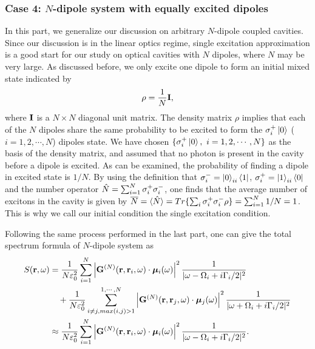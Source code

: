 \subsubsection{Case 4: $N$-dipole system with equally excited dipoles}\label{section:initialcondition}
In this part, we generalize our discussion on arbitrary $N$-dipole coupled cavities. Since our discussion is in the linear optics regime, single excitation approximation is a good start for our study on optical cavities with $N$ dipoles, where $N$ may be very large. As discussed before, we only excite one dipole to form an initial mixed state indicated by
\begin{equation}
\rho=\frac{1}{N}\mathbf{I},
\end{equation}
where $\mathbf{I}$ is a $N\times N$ diagonal unit matrix. The density matrix $\rho$ implies that each of the $N$ dipoles share the same probability to be excited to form the $\sigma^{+}_i\mathinner{|{0}\rangle}$ ($i=1,2,\cdots,N$) dipoles state. We have chosen $\lbrace \sigma^{+}_i\mathinner{|{0}\rangle},\, \,i=1,2,\cdots,N \rbrace$ as the basis of the density matrix, and assumed that no photon is present in the cavity before a dipole is excited. As can be examined, the probability of finding a dipole in excited state is $1/N$. By using the definition that $\sigma^{-}_i=\mathinner{|{0}\rangle}_{ii}\mathinner{\langle{1}|}$, $\sigma^{+}_i=\mathinner{|{1}\rangle}_{ii}\mathinner{\langle{0}|}$ and the number operator $\hat{N}=\sum_{i=1}^N{\sigma^{+}_i \sigma^{-}_i}$, one finds that the average number of excitons in the cavity is given by
$\overline{N}=\mathinner{\langle{\hat{N}}\rangle}=Tr\lbrace \sum_i{\sigma^{+}_i \sigma^{-}_i} \rho\rbrace = \sum_{i=1}^N{1/N}=1$. This is why we call our initial condition the single excitation condition.

Following the same process performed in the last part, one can give the total spectrum formula of $N$-dipole system as
\begin{align}
S({\bf r},\omega)&=\frac{1}{N\varepsilon_0^2}\sum_{i=1}^N{\left| \mathbf{G}^{(N)}(\mathbf{r},\mathbf{r}_i,\omega)\cdot {\bm \mu}_i(\omega) \right|^2 \frac{1}{|\omega-\Omega_i+i\Gamma_i/2|^2}} \nonumber \\
&\quad +\frac{1}{N\varepsilon_0^2}\sum_{i\neq j,max(i,j)>1}^{1,\cdots,N}{\left| \mathbf{G}^{(N)}(\mathbf{r},\mathbf{r}_j,\omega)\cdot {\bm \mu}_j(\omega) \right|^2 \frac{1}{|\omega+\Omega_i+i\Gamma_i/2|^2}}\label{eq:sN_mixedstate_withdecay0}\\
&\approx \frac{1}{N\varepsilon_0^2}\sum_{i=1}^N{\left| \mathbf{G}^{(N)}(\mathbf{r},\mathbf{r}_i,\omega)\cdot {\bm \mu}_i(\omega) \right|^2 \frac{1}{|\omega-\Omega_i+i\Gamma_i/2|^2}}. \label{eq:sN_mixedstate_withdecay}
\end{align}

